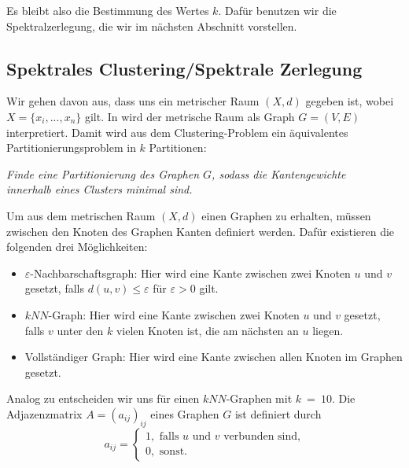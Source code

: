 \documentclass[twoside, 12pt,a4paper]{book}
\numberwithin{equation}{section}
\begin{document}
	\noindent Es bleibt also die Bestimmung des Wertes $k$.
	Dafür benutzen wir die Spektralzerlegung, die wir im nächsten Abschnitt vorstellen.
	
	\newpage
	\subsection{Spektrales Clustering/Spektrale Zerlegung}
	
	\noindent Wir gehen davon aus, dass uns ein metrischer Raum $(X,d)$ gegeben ist, wobei $X = \lbrace x_i, ..., x_n \rbrace$ gilt.
	In \cite{spectralClustering_tut} wird der metrische Raum als Graph ${G=(V,E)}$ interpretiert. Damit wird aus dem Clustering-Problem ein äquivalentes Partitionierungsproblem in $k$ Partitionen:
	\begin{center}
		\textit{Finde eine Partitionierung des Graphen $G$, sodass die Kantengewichte \\innerhalb eines Clusters minimal sind.}
	\end{center}
	\noindent Um aus dem metrischen Raum $(X,d)$ einen Graphen zu erhalten, müssen zwischen den Knoten des Graphen Kanten definiert werden. Dafür existieren die folgenden drei Möglichkeiten:
	
	\begin{itemize}
		\item $\varepsilon$-Nachbarschaftsgraph: Hier wird eine Kante zwischen zwei Knoten $u$ und $v$ gesetzt, falls $d(u,v) \leq \varepsilon$ für $\varepsilon > 0$ gilt.
		\item $kNN$-Graph: Hier wird eine Kante zwischen zwei Knoten $u$ und $v$ gesetzt, falls $v$ unter den $k$ vielen Knoten ist, die am nächsten an $u$ liegen.
		\item Vollständiger Graph: Hier wird eine Kante zwischen allen Knoten im Graphen gesetzt.
	\end{itemize}
	
	\noindent Analog zu \cite{unmaskingCH} entscheiden wir uns für einen $kNN$-Graphen mit $k~=~10$. Die Adjazenzmatrix $A = (a_{ij})_{ij}$ eines Graphen $G$ ist definiert durch
	\begin{equation}
	a_{ij} = \begin{cases}
	1, \text{ falls  } u \text{ und } v \text{ verbunden sind,}\\
	0, \text{ sonst.}
	\end{cases}
	\end{equation}
	
\end{document}
